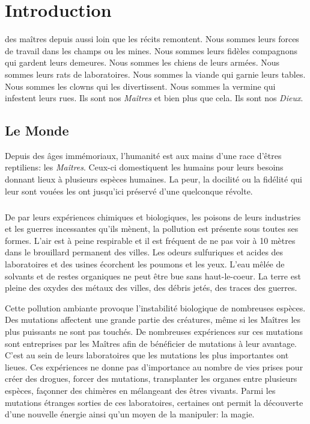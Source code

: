 \chapter{Introduction}




 des maîtres depuis aussi loin que les récits remontent.
Nous sommes leurs forces de travail dans les champs ou les mines. 
Nous sommes leurs fidèles compagnons qui gardent leurs demeures.
Nous sommes les chiens de leurs armées.
Nous sommes leurs rats de laboratoires. 
Nous sommes la viande qui garnie leurs tables.
Nous sommes les clowns qui les divertissent.
Nous sommes la vermine qui infestent leurs rues.
Ils sont nos \emph{Maîtres} et bien plus que cela. Ils sont nos \emph{Dieux}.

\section{Le Monde}
Depuis des âges immémoriaux, l'humanité est aux mains d'une race d'êtres reptiliens: les \emph{Maîtres}. Ceux-ci domestiquent les humains pour leurs besoins donnant lieux à plusieurs espèces humaines. La peur, la docilité ou la fidélité qui leur sont vouées les ont jusqu'ici préservé d'une quelconque révolte.

\paragraph{}
De par leurs expériences chimiques et biologiques, les poisons de leurs industries et les guerres incessantes qu'ils mènent, la pollution est présente sous toutes ses formes. L'air est à peine respirable et il est fréquent de ne pas voir à 10 mètres dans le brouillard permanent des villes. Les odeurs sulfuriques et acides des laboratoires et des usines écorchent les poumons et les yeux. L'eau mêlée de solvants et de restes organiques ne peut être bue sans haut-le-coeur. La terre est pleine des oxydes des métaux des villes, des débris jetés, des traces des guerres.

Cette pollution ambiante provoque l'instabilité biologique de nombreuses espèces. Des mutations affectent une grande partie des créatures, même si les Maîtres les plus puissants ne sont pas touchés. De nombreuses expériences sur ces mutations sont entreprises par les Maîtres afin de bénéficier de mutations à leur avantage. C'est au sein de leurs laboratoires que les mutations les plus importantes ont lieues. Ces expériences ne donne pas d'importance au nombre de vies prises pour créer des drogues, forcer des mutations, transplanter les organes entre plusieurs espèces, façonner des chimères en mélangeant des êtres vivants. Parmi les mutations étranges sorties de ces laboratoires, certaines ont permit la découverte d'une nouvelle énergie ainsi qu'un moyen de la manipuler: la magie.

